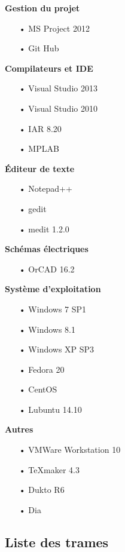 \documentclass[10pt,a4paper,final]{article}
\begin{document}
\begin{spacing}{1.5}
\begin{flushleft}
\begin{multicols}{3}
\textbf{Gestion du projet}
\begin{itemize}
\item[•]MS Project 2012
\item[•]Git Hub
\end{itemize}

\textbf{Compilateurs et IDE}
\begin{itemize}
\item[•]Visual Studio 2013
\item[•]Visual Studio 2010
\item[•]IAR 8.20
\item[•]MPLAB
\end{itemize}

\textbf{Éditeur de texte}
\begin{itemize}
\item[•]Notepad++
\item[•]gedit
\item[•]medit 1.2.0
\end{itemize}
\textbf{Schémas électriques}

\begin{itemize}
\item[•]OrCAD 16.2
\end{itemize}

\bigskip

\textbf{Système d'exploitation}
\begin{itemize}
\item[•]Windows 7 SP1
\item[•]Windows 8.1
\item[•]Windows XP SP3
\item[•]Fedora 20
\item[•]CentOS
\item[•]Lubuntu 14.10
\end{itemize}

\textbf{Autres}
\begin{itemize}
\item[•]VMWare Workstation 10
\item[•]TeXmaker 4.3
\item[•]Dukto R6
\item[•]Dia
\end{itemize}

\end{multicols}
\end{flushleft}
\begin{flushleft}
\HRule
\end{flushleft}

\pagebreak
\subsection{Liste des trames}


\end{spacing}
\end{document}
